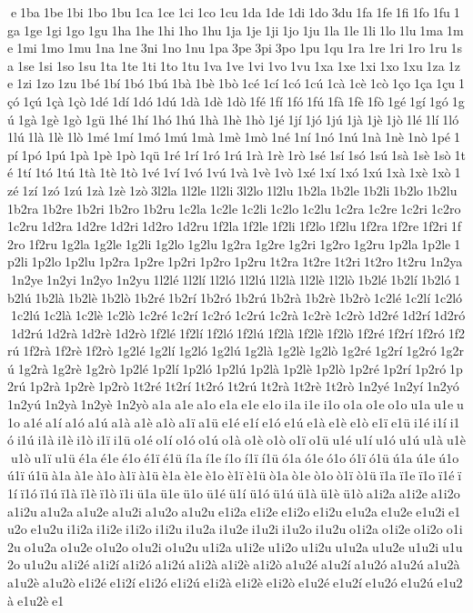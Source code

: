 e 1ba 1be 1bi 1bo 1bu 1ca 1ce 1ci 1co 1cu 1da 1de 1di 1do 3du 1fa 1fe 1fi 1fo 1fu 1ga 1ge 1gi 1go 1gu 1ha 1he 1hi 1ho 1hu 1ja 1je 1ji 1jo 1ju 1la 1le 1li 1lo 1lu 1ma 1me 1mi 1mo 1mu 1na 1ne 3ni 1no 1nu 1pa 3pe 3pi 3po 1pu 1qu 1ra 1re 1ri 1ro 1ru 1sa 1se 1si 1so 1su 1ta 1te 1ti 1to 1tu 1va 1ve 1vi 1vo 1vu 1xa 1xe 1xi 1xo 1xu 1za 1ze 1zi 1zo 1zu 1bé 1bí 1bó 1bú 1bà 1bè 1bò 1cé 1cí 1có 1cú 1cà 1cè 1cò 1ço 1ça 1çu 1çó 1çú 1çà 1çò 1dé 1dí 1dó 1dú 1dà 1dè 1dò 1fé 1fí 1fó 1fú 1fà 1fè 1fò 1gé 1gí 1gó 1gú 1gà 1gè 1gò 1gü 1hé 1hí 1hó 1hú 1hà 1hè 1hò 1jé 1jí 1jó 1jú 1jà 1jè 1jò 1lé 1lí 1ló 1lú 1là 1lè 1lò 1mé 1mí 1mó 1mú 1mà 1mè 1mò 1né 1ní 1nó 1nú 1nà 1nè 1nò 1pé 1pí 1pó 1pú 1pà 1pè 1pò 1qü 1ré 1rí 1ró 1rú 1rà 1rè 1rò 1sé 1sí 1só 1sú 1sà 1sè 1sò 1té 1tí 1tó 1tú 1tà 1tè 1tò 1vé 1ví 1vó 1vú 1và 1vè 1vò 1xé 1xí 1xó 1xú 1xà 1xè 1xò 1zé 1zí 1zó 1zú 1zà 1zè 1zò 3l2la 1l2le 1l2li 3l2lo 1l2lu 1b2la 1b2le 1b2li 1b2lo 1b2lu 1b2ra 1b2re 1b2ri 1b2ro 1b2ru 1c2la 1c2le 1c2li 1c2lo 1c2lu 1c2ra 1c2re 1c2ri 1c2ro 1c2ru 1d2ra 1d2re 1d2ri 1d2ro 1d2ru 1f2la 1f2le 1f2li 1f2lo 1f2lu 1f2ra 1f2re 1f2ri 1f2ro 1f2ru 1g2la 1g2le 1g2li 1g2lo 1g2lu 1g2ra 1g2re 1g2ri 1g2ro 1g2ru 1p2la 1p2le 1p2li 1p2lo 1p2lu 1p2ra 1p2re 1p2ri 1p2ro 1p2ru 1t2ra 1t2re 1t2ri 1t2ro 1t2ru 1n2ya 1n2ye 1n2yi 1n2yo 1n2yu 1l2lé 1l2lí 1l2ló 1l2lú 1l2là 1l2lè 1l2lò 1b2lé 1b2lí 1b2ló 1b2lú 1b2là 1b2lè 1b2lò 1b2ré 1b2rí 1b2ró 1b2rú 1b2rà 1b2rè 1b2rò 1c2lé 1c2lí 1c2ló 1c2lú 1c2là 1c2lè 1c2lò 1c2ré 1c2rí 1c2ró 1c2rú 1c2rà 1c2rè 1c2rò 1d2ré 1d2rí 1d2ró 1d2rú 1d2rà 1d2rè 1d2rò 1f2lé 1f2lí 1f2ló 1f2lú 1f2là 1f2lè 1f2lò 1f2ré 1f2rí 1f2ró 1f2rú 1f2rà 1f2rè 1f2rò 1g2lé 1g2lí 1g2ló 1g2lú 1g2là 1g2lè 1g2lò 1g2ré 1g2rí 1g2ró 1g2rú 1g2rà 1g2rè 1g2rò 1p2lé 1p2lí 1p2ló 1p2lú 1p2là 1p2lè 1p2lò 1p2ré 1p2rí 1p2ró 1p2rú 1p2rà 1p2rè 1p2rò 1t2ré 1t2rí 1t2ró 1t2rú 1t2rà 1t2rè 1t2rò 1n2yé 1n2yí 1n2yó 1n2yú 1n2yà 1n2yè 1n2yò a1a a1e a1o e1a e1e e1o i1a i1e i1o o1a o1e o1o u1a u1e u1o a1é a1í a1ó a1ú a1à a1è a1ò a1ï a1ü e1é e1í e1ó e1ú e1à e1è e1ò e1ï e1ü i1é i1í i1ó i1ú i1à i1è i1ò i1ï i1ü o1é o1í o1ó o1ú o1à o1è o1ò o1ï o1ü u1é u1í u1ó u1ú u1à u1è u1ò u1ï u1ü é1a é1e é1o é1ï é1ü í1a í1e í1o í1ï í1ü ó1a ó1e ó1o ó1ï ó1ü ú1a ú1e ú1o ú1ï ú1ü à1a à1e à1o à1ï à1ü è1a è1e è1o è1ï è1ü ò1a ò1e ò1o ò1ï ò1ü ï1a ï1e ï1o ï1é ï1í ï1ó ï1ú ï1à ï1è ï1ò ï1i ü1a ü1e ü1o ü1é ü1í ü1ó ü1ú ü1à ü1è ü1ò a1i2a a1i2e a1i2o a1i2u a1u2a a1u2e a1u2i a1u2o a1u2u e1i2a e1i2e e1i2o e1i2u e1u2a e1u2e e1u2i e1u2o e1u2u i1i2a i1i2e i1i2o i1i2u i1u2a i1u2e i1u2i i1u2o i1u2u o1i2a o1i2e o1i2o o1i2u o1u2a o1u2e o1u2o o1u2i o1u2u u1i2a u1i2e u1i2o u1i2u u1u2a u1u2e u1u2i u1u2o u1u2u a1i2é a1i2í a1i2ó a1i2ú a1i2à a1i2è a1i2ò a1u2é a1u2í a1u2ó a1u2ú a1u2à a1u2è a1u2ò e1i2é e1i2í e1i2ó e1i2ú e1i2à e1i2è e1i2ò e1u2é e1u2í e1u2ó e1u2ú e1u2à e1u2è e1